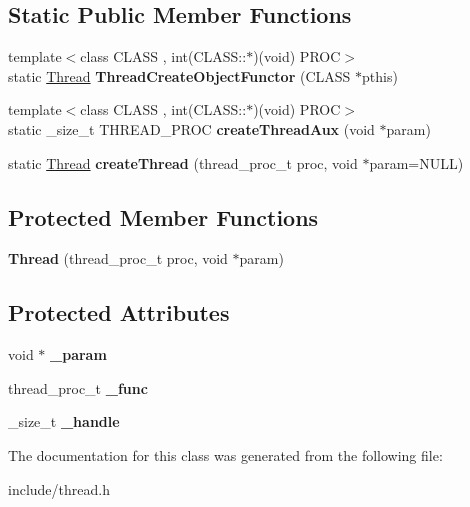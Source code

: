 \subsection*{Static Public Member Functions}
\begin{DoxyCompactItemize}
\item 
{\footnotesize template$<$class C\+L\+A\+SS , int(\+C\+L\+A\+S\+S\+::$\ast$)(void) P\+R\+OC$>$ }\\static \hyperlink{class_thread}{Thread} {\bfseries Thread\+Create\+Object\+Functor} (C\+L\+A\+SS $\ast$pthis)\hypertarget{class_thread_a3f90db7b5d45b275989c328ef070fb98}{}\label{class_thread_a3f90db7b5d45b275989c328ef070fb98}

\item 
{\footnotesize template$<$class C\+L\+A\+SS , int(\+C\+L\+A\+S\+S\+::$\ast$)(void) P\+R\+OC$>$ }\\static \+\_\+size\+\_\+t T\+H\+R\+E\+A\+D\+\_\+\+P\+R\+OC {\bfseries create\+Thread\+Aux} (void $\ast$param)\hypertarget{class_thread_ad54c62035ca2dcfc71c7e7181ce00454}{}\label{class_thread_ad54c62035ca2dcfc71c7e7181ce00454}

\item 
static \hyperlink{class_thread}{Thread} {\bfseries create\+Thread} (thread\+\_\+proc\+\_\+t proc, void $\ast$param=N\+U\+LL)\hypertarget{class_thread_a80157e1154d2a11085fc5a4fe9f9f1ea}{}\label{class_thread_a80157e1154d2a11085fc5a4fe9f9f1ea}

\end{DoxyCompactItemize}
\subsection*{Protected Member Functions}
\begin{DoxyCompactItemize}
\item 
{\bfseries Thread} (thread\+\_\+proc\+\_\+t proc, void $\ast$param)\hypertarget{class_thread_aa9198eddcbadc060866ec2eb2fae9ef6}{}\label{class_thread_aa9198eddcbadc060866ec2eb2fae9ef6}

\end{DoxyCompactItemize}
\subsection*{Protected Attributes}
\begin{DoxyCompactItemize}
\item 
void $\ast$ {\bfseries \+\_\+param}\hypertarget{class_thread_a59fd8af5b7f6acb58b0e0b40c4bfabdb}{}\label{class_thread_a59fd8af5b7f6acb58b0e0b40c4bfabdb}

\item 
thread\+\_\+proc\+\_\+t {\bfseries \+\_\+func}\hypertarget{class_thread_aa2d5e149d2dbab58296ba4c1da6b2b53}{}\label{class_thread_aa2d5e149d2dbab58296ba4c1da6b2b53}

\item 
\+\_\+size\+\_\+t {\bfseries \+\_\+handle}\hypertarget{class_thread_a1dace00cf3062a0525a479a8c0aea0ee}{}\label{class_thread_a1dace00cf3062a0525a479a8c0aea0ee}

\end{DoxyCompactItemize}


The documentation for this class was generated from the following file\+:\begin{DoxyCompactItemize}
\item 
include/thread.\+h\end{DoxyCompactItemize}
